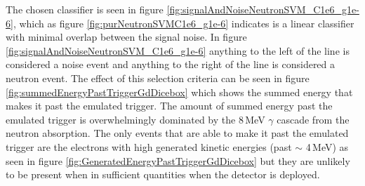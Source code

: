 The chosen classifier is seen in figure \ref{fig:signalAndNoiseNeutronSVM_C1e6_g1e-6}, which as figure \ref{fig:purNeutronSVMC1e6_g1e-6} indicates is a linear classifier with minimal overlap between the signal noise. In figure \ref{fig:signalAndNoiseNeutronSVM_C1e6_g1e-6} anything to the left of the line is considered a noise event and anything to the right of the line is considered a neutron event. The effect of this selection criteria can be seen in figure \ref{fig:summedEnergyPastTriggerGdDicebox} which shows the summed energy that makes it past the emulated trigger. The amount of summed energy past the emulated trigger is overwhelmingly dominated by the 8\,MeV $\gamma$ cascade from the neutron absorption. The only events that are able to make it past the emulated trigger are the electrons with high generated kinetic energies (past $\sim$ 4\,MeV) as seen in figure \ref{fig:GeneratedEnergyPastTriggerGdDicebox} but they are unlikely to be present when in sufficient quantities when the detector is deployed. 

